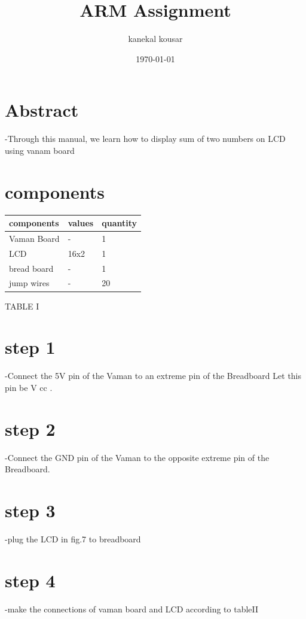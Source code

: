 \documentclass[twocolumn,13pt]{article}
\begin{document}
\title{\textbf{ARM Assignment}}

\author{kanekal kousar}
\date{\today}
\maketitle

 \section{Abstract}-Through this manual, we learn how to display sum of two numbers on LCD using vanam board


\section{components}


\begin{tabular}{ |p{3cm}|p{1.5cm}|p{1.5cm}| }
 \hline
 \setlength{\tabcolsep}{3pt}
components & values & quantity \\
\hline
 Vaman Board &   - & 1\\
 LCD &16x2 & 1\\
 bread board  &-& 1\\
 jump wires&  - & 20\\
 \hline
\end{tabular}
\begin{center}
    TABLE I
\end{center}
 

\section*{step 1}
-Connect the 5V pin of the Vaman to an extreme pin of the Breadboard
Let this pin be V cc .
\section*{step 2}
-Connect the GND pin of the Vaman to the opposite extreme pin of the Breadboard.
\section*{step 3}
-plug the LCD in fig.7 to breadboard
\section*{step 4}
-make the connections of vaman board and LCD according to tableII
\end{document}
